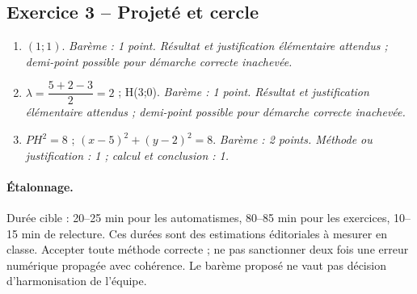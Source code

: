 \subsection*{Exercice 3 -- Projeté et cercle}
\begin{enumerate}
\item $(1;1)$. \textit{Barème : 1 point. Résultat et justification élémentaire attendus ; demi-point possible pour démarche correcte inachevée.}
\item $\lambda =\dfrac{5+2-3}{2}=2$ ; H(3;0). \textit{Barème : 1 point. Résultat et justification élémentaire attendus ; demi-point possible pour démarche correcte inachevée.}
\item $PH^2=8$ ; $(x-5)^2+(y-2)^2=8$. \textit{Barème : 2 points. Méthode ou justification : 1 ; calcul et conclusion : 1.}
\end{enumerate}
\paragraph{Étalonnage.} Durée cible : 20–25 min pour les automatismes, 80–85 min pour les exercices, 10–15 min de relecture. Ces durées sont des estimations éditoriales à mesurer en classe. Accepter toute méthode correcte ; ne pas sanctionner deux fois une erreur numérique propagée avec cohérence. Le barème proposé ne vaut pas décision d’harmonisation de l’équipe.
